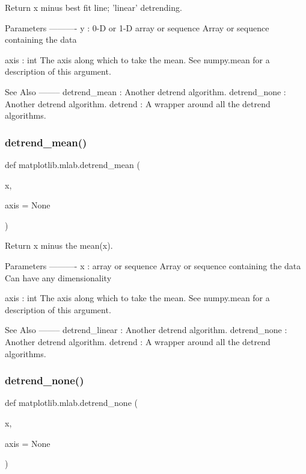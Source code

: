 \begin{DoxyVerb}Return x minus best fit line; 'linear' detrending.

Parameters
----------
y : 0-D or 1-D array or sequence
    Array or sequence containing the data

axis : int
    The axis along which to take the mean.  See numpy.mean for a
    description of this argument.

See Also
--------
detrend_mean : Another detrend algorithm.
detrend_none : Another detrend algorithm.
detrend : A wrapper around all the detrend algorithms.
\end{DoxyVerb}
 \mbox{\label{namespacematplotlib_1_1mlab_a33582c8e986a5abbf517793a90af9ec9}} 
\subsubsection{\texorpdfstring{detrend\+\_\+mean()}{detrend\_mean()}}
{\footnotesize\ttfamily def matplotlib.\+mlab.\+detrend\+\_\+mean (\begin{DoxyParamCaption}\item[{}]{x,  }\item[{}]{axis = {\ttfamily None} }\end{DoxyParamCaption})}

\begin{DoxyVerb}Return x minus the mean(x).

Parameters
----------
x : array or sequence
    Array or sequence containing the data
    Can have any dimensionality

axis : int
    The axis along which to take the mean.  See numpy.mean for a
    description of this argument.

See Also
--------
detrend_linear : Another detrend algorithm.
detrend_none : Another detrend algorithm.
detrend : A wrapper around all the detrend algorithms.
\end{DoxyVerb}
 \mbox{\label{namespacematplotlib_1_1mlab_a359979aa8e0e635738648ca88ebd5e1d}} 
\subsubsection{\texorpdfstring{detrend\+\_\+none()}{detrend\_none()}}
{\footnotesize\ttfamily def matplotlib.\+mlab.\+detrend\+\_\+none (\begin{DoxyParamCaption}\item[{}]{x,  }\item[{}]{axis = {\ttfamily None} }\end{DoxyParamCaption})}

